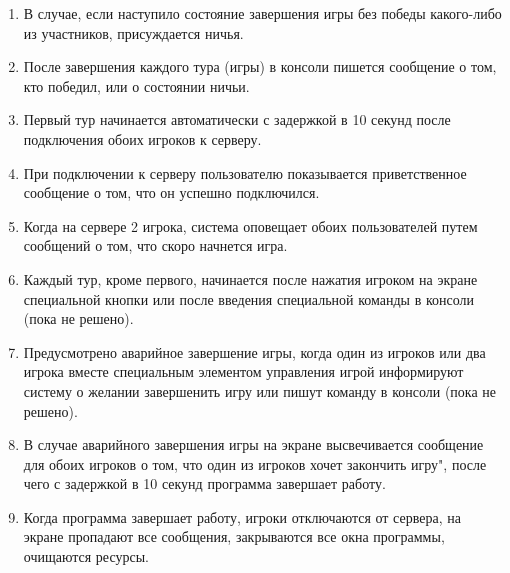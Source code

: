 \begin{enumerate}
	\item В случае, если наступило состояние завершения игры без победы какого-либо из участников, присуждается ничья.
	
	\item После завершения каждого тура (игры) в консоли пишется сообщение о том, кто победил, или о состоянии ничьи.
	
	\item Первый тур начинается автоматически с задержкой в 10 секунд после подключения обоих игроков к серверу.
	
	\item При подключении к серверу пользователю показывается приветственное сообщение о том, что он успешно подключился.
	
	\item Когда на сервере 2 игрока, система оповещает обоих пользователей путем сообщений о том, что скоро начнется игра.
	
	\item Каждый тур, кроме первого, начинается после нажатия игроком на экране специальной кнопки или после введения специальной команды в консоли (пока не решено).
	
	\item Предусмотрено аварийное завершение игры, когда один из игроков или два игрока вместе специальным элементом управления игрой информируют систему о желании завершенить игру или пишут команду в консоли (пока не решено).
	
	\item В случае аварийного завершения игры на экране высвечивается сообщение для обоих игроков о том, что один из игроков хочет закончить игру", после чего с задержкой в 10 секунд программа завершает работу.
	
	\item Когда программа завершает работу, игроки отключаются от сервера, на экране пропадают все сообщения, закрываются все окна программы, очищаются ресурсы.

\end{enumerate}